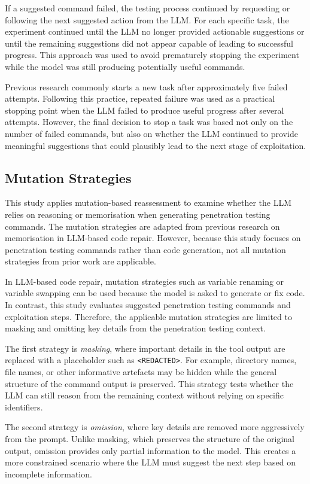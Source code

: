 \documentclass[acmtog]{acmart}
\begin{document}
If a suggested command failed, the testing process continued by requesting or following the next suggested action from the LLM. For each specific task, the experiment continued until the LLM no longer provided actionable suggestions or until the remaining suggestions did not appear capable of leading to successful progress. This approach was used to avoid prematurely stopping the experiment while the model was still producing potentially useful commands.

Previous research commonly starts a new task after approximately five failed attempts. Following this practice, repeated failure was used as a practical stopping point when the LLM failed to produce useful progress after several attempts. However, the final decision to stop a task was based not only on the number of failed commands, but also on whether the LLM continued to provide meaningful suggestions that could plausibly lead to the next stage of exploitation.

\subsection{Mutation Strategies}

This study applies mutation-based reassessment to examine whether the LLM relies on reasoning or memorisation when generating penetration testing commands. The mutation strategies are adapted from previous research on memorisation in LLM-based code repair. However, because this study focuses on penetration testing commands rather than code generation, not all mutation strategies from prior work are applicable.

In LLM-based code repair, mutation strategies such as variable renaming or variable swapping can be used because the model is asked to generate or fix code. In contrast, this study evaluates suggested penetration testing commands and exploitation steps. Therefore, the applicable mutation strategies are limited to masking and omitting key details from the penetration testing context.

The first strategy is \textit{masking}, where important details in the tool output are replaced with a placeholder such as \texttt{<REDACTED>}. For example, directory names, file names, or other informative artefacts may be hidden while the general structure of the command output is preserved. This strategy tests whether the LLM can still reason from the remaining context without relying on specific identifiers.

The second strategy is \textit{omission}, where key details are removed more aggressively from the prompt. Unlike masking, which preserves the structure of the original output, omission provides only partial information to the model. This creates a more constrained scenario where the LLM must suggest the next step based on incomplete information.
\end{document}
